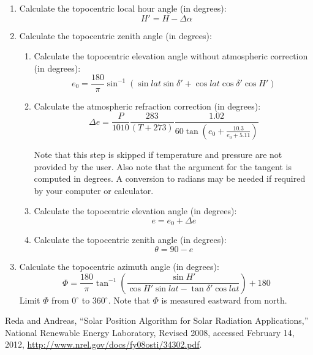 {\begin{enumerate}
\item Calculate the topocentric local hour angle (in degrees):
\begin{displaymath}
H' = H - \Delta \alpha
\end{displaymath}

\item Calculate the topocentric zenith angle (in degrees):
  \begin{enumerate}


    \item Calculate the topocentric elevation angle without atmospheric correction (in degrees):
    \begin{displaymath}
    e_0 = \frac{180}{\pi} \sin^{-1} (\sin{lat} \sin{\delta'} + \cos{lat} \cos{\delta'} \cos{H'})
    \end{displaymath}
    
    \item Calculate the atmospheric refraction correction (in degrees):
    \begin{displaymath}
    \Delta e = \frac{P}{1010} \frac{283}{(T + 273)} \frac{1.02}{60 \tan{\left(e_0 + \frac{10.3}{e_0 + 5.11}\right)}}
    \end{displaymath}

    Note that this step is skipped if temperature and pressure are not provided by the user. Also note that the argument for the
    tangent is computed in degrees. A conversion to radians may be needed if required by your computer or calculator. 

    \item Calculate the topocentric elevation angle (in degrees):
    \begin{displaymath}
    e = e_0 + \Delta e
    \end{displaymath}

    \item Calculate the topocentric zenith angle (in degrees):
    \begin{displaymath}
    \theta = 90 - e
    \end{displaymath}

  \end{enumerate}

\item Calculate the topocentric azimuth angle (in degrees):
\begin{displaymath}
\Phi = \frac {180}{\pi} \tan^{-1}{\left(\frac{\sin{H'}}{\cos{H'} \sin{lat} - \tan{\delta'}\cos{lat}}\right)} + 180
\end{displaymath}
Limit $\Phi$ from 0$^\circ$ to 360$^\circ$. Note that $\Phi$ is measured eastward from north.

\end{enumerate}
}
{ %


}
{ %
Reda and Andreas, ``Solar Position Algorithm for Solar Radiation Applications,'' National Renewable Energy Laboratory, Revised 2008, accessed February 14, 2012, \href{http://www.nrel.gov/docs/fy08osti/34302.pdf}{http://www.nrel.gov/docs/fy08osti/34302.pdf}. \cite{Reda}
}


